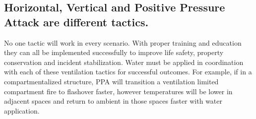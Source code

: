 \documentclass{article}
\begin{document}
\subsection{Horizontal, Vertical and Positive Pressure Attack are different tactics.} No one tactic will work in every scenario.  With proper training and education they can all be implemented successfully to improve life safety, property conservation and incident stabilization.  Water must be applied in coordination with each of these ventilation tactics for successful outcomes.   For example, if in a compartmentalized structure, PPA will transition a ventilation limited compartment fire to flashover faster, however temperatures will be lower in adjacent spaces and return to ambient in those spaces faster with water application.


\newpage

 
\end{document}

